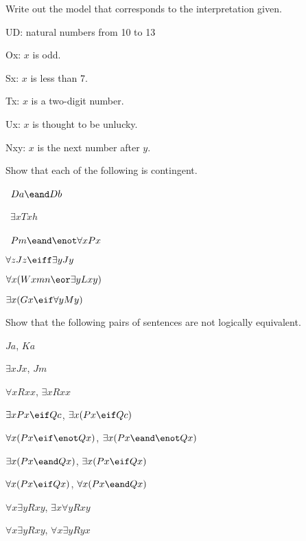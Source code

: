 \solutions
\problempart
\label{pr.InterpretationToModel}
Write out the model that corresponds to the interpretation given.
\begin{ekey}
\item{UD:} natural numbers from 10 to 13
\item{Ox:} $x$ is odd. 
\item{Sx:} $x$ is less than 7.
\item{Tx:} $x$ is a two-digit number.
\item{Ux:} $x$ is thought to be unlucky.
\item{Nxy:} $x$ is the next number after $y$.
\end{ekey}


\problempart
\label{pr.Contingent}
Show that each of the following is contingent.
\begin{earg}
\item \leftsolutions\ $Da \eand Db$
\item \leftsolutions\ $\exists x Txh$
\item \leftsolutions\ $Pm \eand \enot\forall x Px$
\item $\forall z Jz \eiff \exists y Jy$
\item $\forall x (Wxmn \eor \exists yLxy)$
\item $\exists x (Gx \eif \forall y My)$
\end{earg}

\solutions
\problempart
\label{pr.NotEquiv}
Show that the following pairs of sentences are not logically equivalent.
\begin{earg}
\item $Ja$, $Ka$
\item $\exists x Jx$, $Jm$
\item $\forall x Rxx$, $\exists x Rxx$
\item $\exists x Px \eif Qc$, $\exists x (Px \eif Qc)$
\item $\forall x(Px \eif \enot Qx)$, $\exists x(Px \eand \enot Qx)$
\item $\exists x(Px \eand Qx)$, $\exists x(Px \eif Qx)$
\item $\forall x(Px\eif Qx)$, $\forall x(Px \eand Qx)$
\item $\forall x\exists y Rxy$, $\exists x\forall y Rxy$
\item $\forall x\exists y Rxy$, $\forall x\exists y Ryx$
\end{earg}



